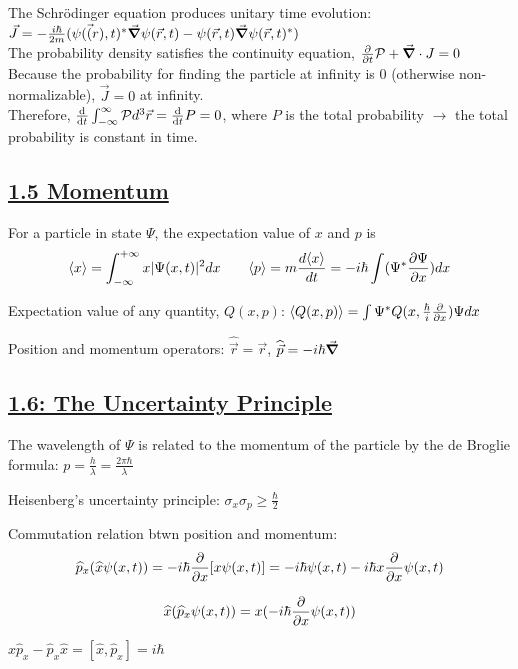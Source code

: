 The Schr\"odinger equation produces unitary time evolution: \\
$\vec{J} = - \frac{i \hbar}{2m} (\psi(\vec(r), t)^* \vec{\grad} \psi(\vec{r}, t) - \psi(\vec{r}, t) \vec{\grad} \psi(\vec{r}, t)^*)$ \\
The probability density satisfies the continuity equation, $\pdv{}{t} \mathcal{P} + \vec{\grad} \cdot J = 0$ \\
Because the probability for finding the particle at infinity is 0 (otherwise non-normalizable), $\vec{J} = 0$ at infinity. \\
Therefore, $\dv{}{t} \int_{-\infty}^{\infty} \mathcal{P} d^3 \vec{r} = \dv{}{t} P = 0$, where $P$ is the total probability $\rightarrow$
the total probability is constant in time.

\subsection{\underline{1.5 Momentum}}
For a particle in state $\Psi$, the expectation value of $x$ and $p$ is
    $$\langle x \rangle = \int_{-\infty}^{+\infty} x |\Psi(x, t)|^2 dx \qquad \langle p \rangle = m \frac{d \langle x \rangle}{dt} = -i \hbar \int (\Psi^* \pdv{\Psi}{x}) dx$$

Expectation value of any quantity, $Q(x, p)$:
$\langle Q(x, p) \rangle = \int \Psi^* Q(x, \frac{\hbar}{i} \pdv{}{x}) \Psi dx$

Position and momentum operators: $\widehat{\vec{r}} = \vec{r}$, $\widehat{\vec{p}} = -i \hbar \vec{\grad}$

\subsection{\underline{1.6: The Uncertainty Principle}}
The wavelength of $\Psi$ is related to the momentum of the particle by the de Broglie formula:
    $p = \frac{h}{\lambda} = \frac{2 \pi \hbar}{\lambda}$

Heisenberg's uncertainty principle: $\sigma_x \sigma_p \geq \frac{\hbar}{2}$

Commutation relation btwn position and momentum:
$$\widehat{p}_x (\widehat{x} \psi(x, t)) = -i \hbar \pdv{}{x} [x \psi(x, t)] = -i \hbar \psi(x, t) - i \hbar x \pdv{}{x} \psi(x, t)$$

$$\widehat{x} (\widehat{p}_x \psi(x, t)) = x (-i \hbar \pdv{}{x} \psi(x, t))$$

$\widehat{x} \widehat{p}_x - \widehat{p}_x \widehat{x} = [\widehat{x}, \widehat{p}_x] = i \hbar$

